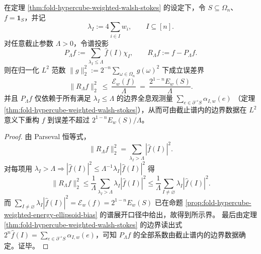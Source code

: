 \begin{theorem}\label{thm:fold-hypercube-walsh-stokes-energy-cutoff-reconstruction}
在定理 \ref{thm:fold-hypercube-weighted-walsh-stokes} 的设定下，令 \(S\subseteq\Omega_n\)、\(f=\mathbf 1_S\)，并记
\[
\lambda_I:=4\sum_{i\in I}w_i,\qquad I\subseteq[n].
\]
对任意截止参数 \(\Lambda>0\)，令谱投影
\[
P_{\Lambda}f:=\sum_{\lambda_I\le \Lambda}\widehat f(I)\chi_I,
\qquad
R_{\Lambda}f:=f-P_{\Lambda}f.
\]
则在归一化 \(L^2\) 范数 \(\|g\|_2^2:=2^{-n}\sum_{\omega\in\Omega_n}g(\omega)^2\) 下成立误差界
\[
\boxed{\;\|R_{\Lambda}f\|_2^2\ \le\ \frac{\mathcal E_w(f)}{\Lambda}\ =\ \frac{2^{1-n}E_w(S)}{\Lambda}.\;}
\]
并且 \(P_\Lambda f\) 仅依赖于所有满足 \(\lambda_I\le \Lambda\) 的边界全息观测量
\(
\sum_{e\in\partial^{\to}S}\alpha_{I,w}(e)
\)
（定理 \ref{thm:fold-hypercube-weighted-walsh-stokes}），从而可由截止谱内的边界数据在 \(L^2\) 意义下重构 \(f\) 到误差不超过 \(2^{1-n}E_w(S)/\Lambda\)。
\end{theorem}
\begin{proof}
由 Parseval 恒等式，
\[
\|R_{\Lambda}f\|_2^2=\sum_{\lambda_I>\Lambda}|\widehat f(I)|^2.
\]
对每项用 \(\lambda_I>\Lambda\Rightarrow |\widehat f(I)|^2\le \Lambda^{-1}\lambda_I|\widehat f(I)|^2\) 得
\[
\|R_{\Lambda}f\|_2^2
\le
\frac{1}{\Lambda}\sum_{\lambda_I>\Lambda}\lambda_I|\widehat f(I)|^2
\le
\frac{1}{\Lambda}\sum_{I\ne\varnothing}\lambda_I|\widehat f(I)|^2.
\]
而 \(\sum_{I\ne\varnothing}\lambda_I|\widehat f(I)|^2=\mathcal E_w(f)=2^{1-n}E_w(S)\) 已在命题 \ref{prop:fold-hypercube-weighted-energy-ellipsoid-bias} 的谱展开口径中给出，故得到所示界。
最后由定理 \ref{thm:fold-hypercube-weighted-walsh-stokes} 的边界读出式 \(2^n\widehat f(I)=\sum_{e\in\partial^{\to}S}\alpha_{I,w}(e)\)，可知 \(P_\Lambda f\) 的全部系数由截止谱内的边界数据确定。证毕。
\end{proof}

\endinput

